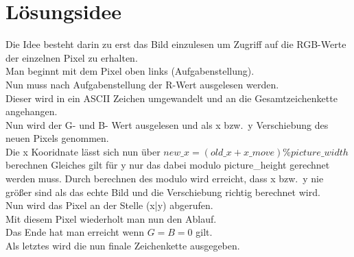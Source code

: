 \section{Lösungsidee}\label{sec:idea}
\begin{flushleft}
Die Idee besteht darin zu erst das Bild einzulesen um Zugriff auf die RGB-Werte der einzelnen Pixel zu erhalten.\\
Man beginnt mit dem Pixel oben links (Aufgabenstellung).\\
Nun muss nach Aufgabenstellung der R-Wert ausgelesen werden.\\
Dieser wird in ein ASCII Zeichen umgewandelt und an die Gesamtzeichenkette angehangen.\\
Nun wird der G- und B- Wert ausgelesen und als x bzw.\ y Verschiebung des neuen Pixels genommen.\\

Die x Kooridnate lässt sich nun über $new\_x = (old\_x + x\_move)\%picture\_width$ berechnen
Gleiches gilt für y nur das dabei modulo picture\_height gerechnet werden muss.
Durch berechnen des modulo wird erreicht, dass x bzw.\ y nie größer sind als das echte Bild und die Verschiebung richtig berechnet wird.\\
Nun wird das Pixel an der Stelle (x|y) abgerufen.\\
Mit diesem Pixel wiederholt man nun den Ablauf.\\
Das Ende hat man erreicht wenn $G = B = 0$ gilt.\\
Als letztes wird die nun finale Zeichenkette ausgegeben.\\
\end{flushleft}
